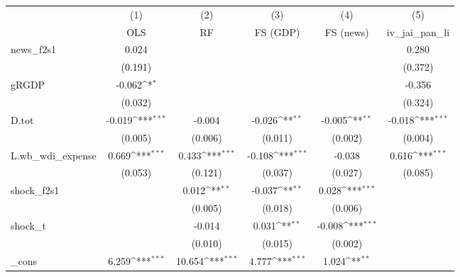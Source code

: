 {
\def\sym#1{\ifmmode^{#1}\else\(^{#1}\)\fi}
\begin{tabular}{l*{5}{c}}
\toprule
            &\multicolumn{1}{c}{(1)}&\multicolumn{1}{c}{(2)}&\multicolumn{1}{c}{(3)}&\multicolumn{1}{c}{(4)}&\multicolumn{1}{c}{(5)}\\
            &\multicolumn{1}{c}{OLS}&\multicolumn{1}{c}{RF}&\multicolumn{1}{c}{FS (GDP)}&\multicolumn{1}{c}{FS (news)}&\multicolumn{1}{c}{iv\_jai\_pan\_li}\\
\midrule
news\_f2s1   &       0.024         &                     &                     &                     &       0.280         \\
            &     (0.191)         &                     &                     &                     &     (0.372)         \\
\addlinespace
gRGDP       &      -0.062\sym{*}  &                     &                     &                     &      -0.356         \\
            &     (0.032)         &                     &                     &                     &     (0.324)         \\
\addlinespace
D.tot       &      -0.019\sym{***}&      -0.004         &      -0.026\sym{**} &      -0.005\sym{**} &      -0.018\sym{***}\\
            &     (0.005)         &     (0.006)         &     (0.011)         &     (0.002)         &     (0.004)         \\
\addlinespace
L.wb\_wdi\_expense&       0.669\sym{***}&       0.433\sym{***}&      -0.108\sym{***}&      -0.038         &       0.616\sym{***}\\
            &     (0.053)         &     (0.121)         &     (0.037)         &     (0.027)         &     (0.085)         \\
\addlinespace
shock\_f2s1  &                     &       0.012\sym{**} &      -0.037\sym{**} &       0.028\sym{***}&                     \\
            &                     &     (0.005)         &     (0.018)         &     (0.006)         &                     \\
\addlinespace
shock\_t     &                     &      -0.014         &       0.031\sym{**} &      -0.008\sym{***}&                     \\
            &                     &     (0.010)         &     (0.015)         &     (0.002)         &                     \\
\addlinespace
\_cons      &       6.259\sym{***}&      10.654\sym{***}&       4.777\sym{***}&       1.024\sym{**} &                     \\

\end{tabular}}
